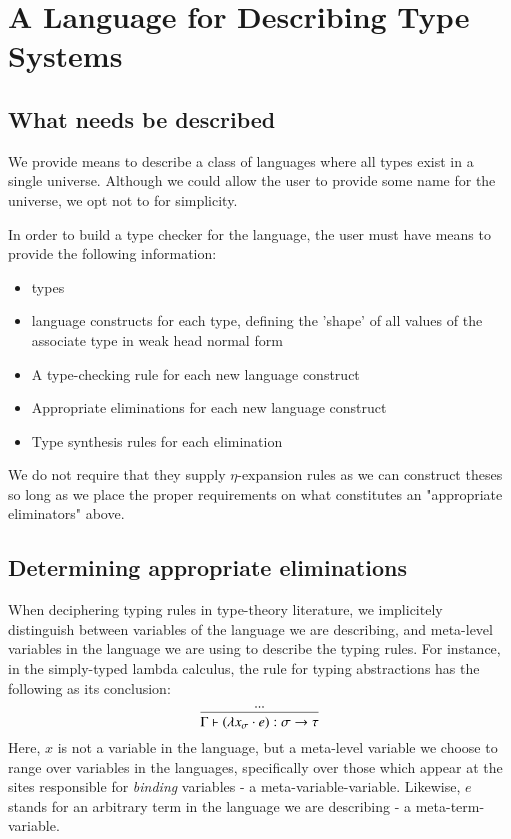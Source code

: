\chapter{A Language for Describing Type Systems}

\section{What needs be described}

We provide means to describe a class of languages where all types
exist in a single universe. Although we could allow the user to
provide some name for the universe, we opt not to for simplicity.

In order to build a type checker for the language, the user must have
means to provide the following information:

\begin{itemize}
  \item types
  \item language constructs for each type, defining the 'shape' of
    all values of the associate type in weak head normal form
  \item A type-checking rule for each new language construct
  \item Appropriate eliminations for each new language construct
  \item Type synthesis rules for each elimination
\end{itemize}

We do not require that they supply $\eta$-expansion rules as we can
construct theses so long as we place the proper requirements on what
constitutes an "appropriate eliminators" above.

\section{Determining appropriate eliminations}
\label{appr-elim}

When deciphering typing rules in type-theory literature, we
implicitely distinguish between variables of the language we are
describing, and meta-level variables in the language we are using to
describe the typing rules. For instance, in the simply-typed lambda
calculus, the rule for typing abstractions has the following as its
conclusion:
$$
\begin{prooftree}
      \hypo{...}
      \infer1[]{\Gamma \vdash (\lambda x_\sigma \cdot e) : \sigma
        \to \tau}
\end{prooftree}
$$
Here, $x$ is not a variable in the language, but a meta-level variable
we choose to range over variables in the languages, specifically over
those which appear at the sites responsible for \emph{binding}
variables - a meta-variable-variable. Likewise, $e$ stands for an
arbitrary term in the language we are describing - a
meta-term-variable.

